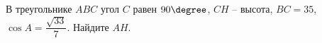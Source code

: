 \begin{ex}
	\begin{condition}
		В треугольнике \( ABC \) угол \( C \) равен \( 90 \degree \), \( CH \) – высота, \( BC=35 \),  \( \cos A =\dfrac{\sqrt{33}}{7} \). Найдите \( AH \).
	\end{condition}
\end{ex}